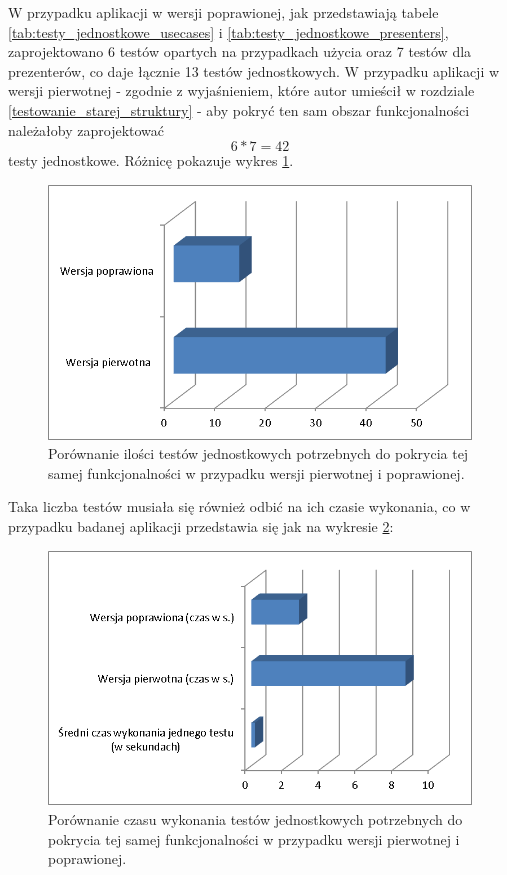 W przypadku aplikacji w wersji poprawionej, jak przedstawiają tabele \ref{tab:testy_jednostkowe_usecases} i \ref{tab:testy_jednostkowe_presenters}, zaprojektowano 6 testów opartych na przypadkach użycia oraz 7 testów dla prezenterów, co daje łącznie 13 testów jednostkowych. W przypadku aplikacji w wersji pierwotnej - zgodnie z wyjaśnieniem, które autor umieścił w rozdziale \ref{testowanie_starej_struktury} - aby pokryć ten sam obszar funkcjonalności należałoby zaprojektować 
\[6*7 = 42\]
 testy jednostkowe. Różnicę pokazuje wykres \ref{fig:app_ut_liczba}.
\begin{figure}[!htb]
    \centering
    \includegraphics[width=12cm]{imgs/ch6_app_ut_liczba.png}
    \caption
{Porównanie ilości testów jednostkowych potrzebnych do pokrycia tej samej funkcjonalności w przypadku wersji pierwotnej i poprawionej. }
    \label{fig:app_ut_liczba}
\end{figure} 

Taka liczba testów musiała się również odbić na ich czasie wykonania, co w przypadku badanej aplikacji przedstawia się jak na wykresie  \ref{fig:app_ut_czas}:
\begin{figure}[!htb]
    \centering
    \includegraphics[width=12cm]{imgs/ch6_app_ut_czas.png}
    \caption
{Porównanie czasu wykonania testów jednostkowych potrzebnych do pokrycia tej samej funkcjonalności w przypadku wersji pierwotnej i poprawionej. }
    \label{fig:app_ut_czas}
\end{figure} 

